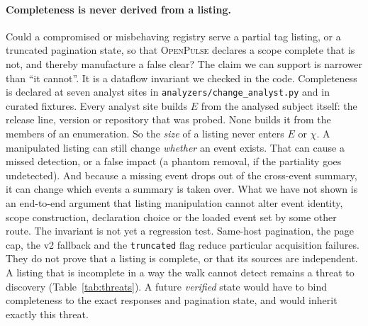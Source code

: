 \documentclass[11pt,a4paper]{article}
\newcommand{\op}{\textsc{OpenPulse}}
\newcommand{\code}[1]{\texttt{#1}}
\begin{document}
\paragraph{Completeness is never derived from a listing.} Could a
compromised or misbehaving registry serve a partial tag listing, or a
truncated pagination state, so that \op{} declares a scope complete
that is not, and thereby manufacture a false clear? The claim we can
support is narrower than ``it cannot''. It is a dataflow invariant we
checked in the code. Completeness is declared at seven
analyst sites in \code{analyzers/change\_analyst.py} and in curated
fixtures. Every analyst site builds $E$ from the analysed subject
itself: the release line, version or repository that was probed. None
builds it from the members of an enumeration. So the \emph{size} of a
listing never enters $E$ or $\chi$. A manipulated listing can still
change \emph{whether} an event exists. That can cause a missed
detection, or a false impact (a phantom removal, if the partiality goes
undetected). And because a missing event drops out of the cross-event
summary, it can change which events a summary is taken over. What we
have not shown is an end-to-end argument that listing manipulation
cannot alter event identity, scope construction, declaration choice or
the loaded event set by some other route. The invariant is not yet a
regression test. Same-host pagination, the page cap, the v2 fallback
and the \code{truncated} flag reduce particular acquisition failures.
They do not prove that a listing is complete, or that its sources are
independent. A listing that is incomplete in a way the walk cannot
detect remains a threat to discovery (Table~\ref{tab:threats}). A
future \emph{verified} state would have to bind completeness to the
exact responses and pagination state, and would inherit exactly this
threat.
\end{document}
